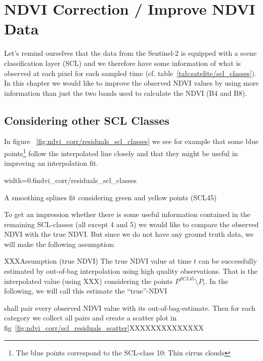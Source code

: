 \chapter{NDVI Correction / Improve NDVI Data}

{
    Let's remind ourselves that the data from the Sentinel-2 is equipped with a scene classification layer (SCL) and we therefore have some information of what is observed at each pixel for each sampled time (cf. table~\ref{tab:satelite/scl_classes}). In this chapter we would like to improve the observed NDVI values by using more information than just the two bands used to calculate the NDVI (B4 and B8).
}

\section{Considering other SCL Classes}{
    In figure ~\ref{fig:ndvi_corr/residuals_scl_classes} we see for example that some blue points\footnote{The blue points correspond to the SCL-class 10: Thin cirrus clouds} follow the interpolated line closely and that they might be useful in improving an interpolation fit.

    \begin{my_figure}[ht]{width=0.6\textwidth}{ndvi_corr/residuals_scl_classes}
        \caption{A smoothing splines fit considering green and yellow points (SCL45)}
        \label{fig:ndvi_corr/residuals_scl_classes}
    \end{my_figure}

    To get an impression whether there is some useful information contained in the remaining SCL-classes (all except 4 and 5) we would like to compare the observed NDVI with the true NDVI. But since we do not have any ground truth data, we will make the following assumption:


    \begin{definition}{XXXAssumption (true NDVI)}
        The true NDVI value at time $t$ can be successfully estimated by out-of-bag interpolation using high quality observations. That is the interpolated value (using XXX) considering the points $P^{SCL45}\setminus P_t$. In the following, we will call this estimate the ``true''-NDVI
    \end{definition}

    shall pair every observed NDVI value with its out-of-bag-estimate. Then for each category we collect all pairs and create a scatter plot in fig~\ref{fig:ndvi_corr/scl_residuals_scatter}XXXXXXXXXXXXXX



}
